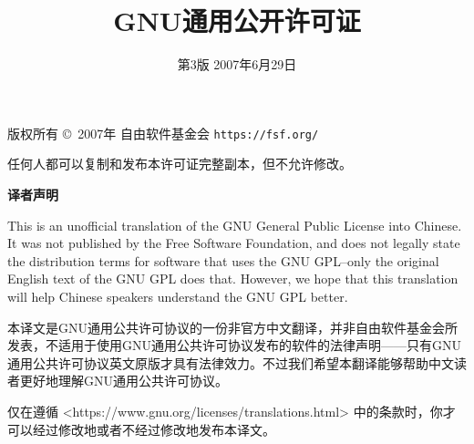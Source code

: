 \documentclass[11pt]{article}
\title{GNU通用公开许可证}
\date{第3版 \space 2007年6月29日}
\begin{document}
\maketitle

\begin{center}
  {\parindent 0in

    版权所有 \copyright\  2007年 自由软件基金会 \texttt{https://fsf.org/}

    \bigskip
    任何人都可以复制和发布本许可证完整副本，但不允许修改。}

\end{center}
\begin{center}
  {\bf\large 译者声明}
\end{center}

This is an unofficial translation of the GNU General Public License into Chinese. It was not published by the Free Software Foundation, and does not legally state the distribution terms for software that uses the GNU GPL--only the original English text of the GNU GPL does that. However, we hope that this translation will help Chinese speakers understand the GNU GPL better.

本译文是GNU通用公共许可协议的一份非官方中文翻译，并非自由软件基金会所发表，不适用于使用GNU通用公共许可协议发布的软件的法律声明——只有GNU通用公共许可协议英文原版才具有法律效力。不过我们希望本翻译能够帮助中文读者更好地理解GNU通用公共许可协议。

仅在遵循 <https://www.gnu.org/licenses/translations.html> 中的条款时，你才可以经过修改地或者不经过修改地发布本译文。

\pagebreak
\end{document}
